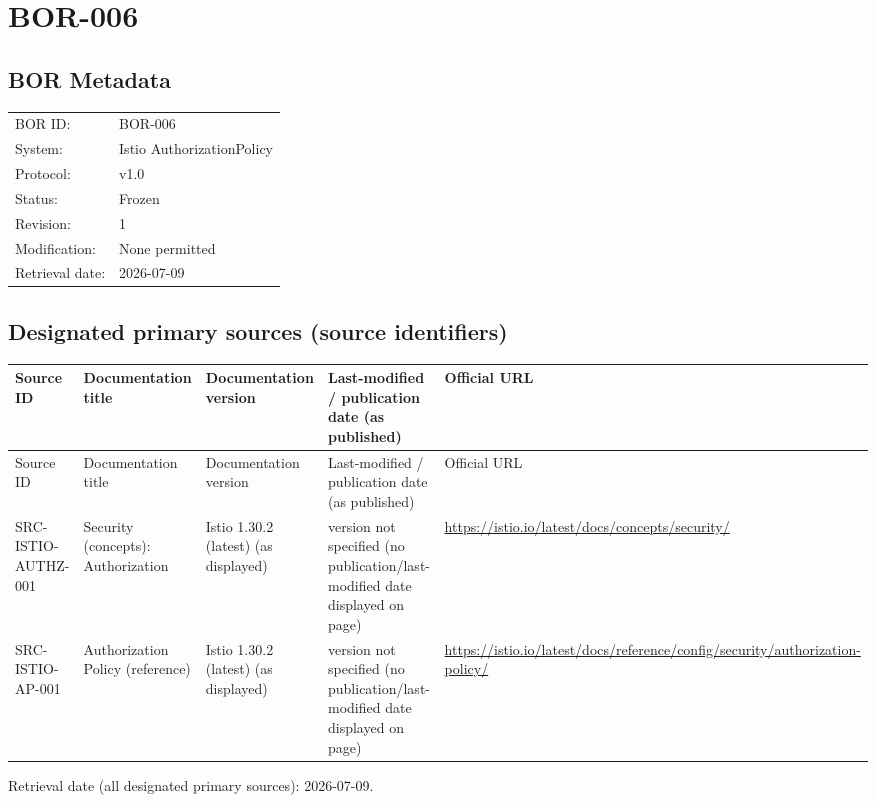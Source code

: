 \documentclass{article}
\begin{document}
\newpage
\section*{BOR-006}

\subsection*{BOR Metadata}
\begin{tabular}{@{}ll@{}}
\toprule
BOR ID: & BOR-006\\
System: & Istio AuthorizationPolicy\\
Protocol: & v1.0\\
Status: & Frozen\\
Revision: & 1\\
Modification: & None permitted\\
Retrieval date: & 2026-07-09\\
\bottomrule
\end{tabular}

\subsection*{Designated primary sources (source identifiers)}
\begin{longtable}{@{}p{}p{}p{}p{}p{}@{}}
\toprule
Source ID & Documentation title & Documentation version & Last-modified / publication date (as published) & Official URL\\
\midrule
\endfirsthead
\toprule
Source ID & Documentation title & Documentation version & Last-modified / publication date (as published) & Official URL\\
\midrule
\endhead
SRC-ISTIO-AUTHZ-001 & Security (concepts): Authorization & Istio 1.30.2 (latest) (as displayed) & version not specified (no publication/last-modified date displayed on page) & \url{https://istio.io/latest/docs/concepts/security/}\\
SRC-ISTIO-AP-001 & Authorization Policy (reference) & Istio 1.30.2 (latest) (as displayed) & version not specified (no publication/last-modified date displayed on page) & \url{https://istio.io/latest/docs/reference/config/security/authorization-policy/}\\
\bottomrule
\end{longtable}
Retrieval date (all designated primary sources): 2026-07-09.
\end{document}
